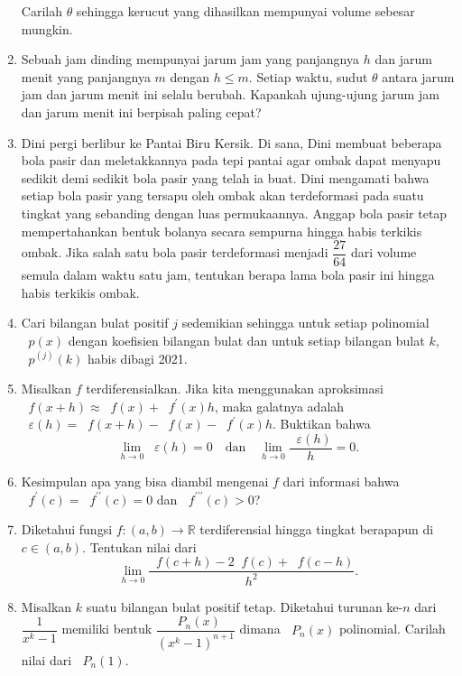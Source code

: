 \documentclass[12pt]{article}
\newcommand*\func[2]{\mathop{}\!{#1}{\left({#2}\right)}}
\begin{document}
\begin{enumerate}[leftmargin=*]
\begin{center}
		\end{center}
		Carilah $ \theta $ sehingga kerucut yang dihasilkan mempunyai volume sebesar mungkin.
		\item Sebuah jam dinding mempunyai jarum jam yang panjangnya $ h $ dan jarum menit yang panjangnya $ m $ dengan $ h \leq m $. Setiap waktu, sudut $ \theta $ antara jarum jam dan jarum menit ini selalu berubah. Kapankah ujung-ujung jarum jam dan jarum menit ini berpisah paling cepat?
		\item Dini pergi berlibur ke Pantai Biru Kersik. Di sana, Dini membuat beberapa bola pasir dan meletakkannya pada tepi pantai agar ombak dapat menyapu sedikit demi sedikit bola pasir yang telah ia buat. Dini mengamati bahwa setiap bola pasir yang tersapu oleh ombak akan terdeformasi pada suatu tingkat yang sebanding dengan luas permukaannya. Anggap bola pasir tetap mempertahankan bentuk bolanya secara sempurna hingga habis terkikis ombak. Jika salah satu bola pasir terdeformasi menjadi $ \dfrac{27}{64} $ dari volume semula dalam waktu satu jam, tentukan berapa lama bola pasir ini hingga habis terkikis ombak.
		\item Cari bilangan bulat positif $ j $ sedemikian sehingga untuk setiap polinomial $ \func{p}{x} $ dengan koefisien bilangan bulat dan untuk setiap bilangan bulat $ k $, $ \func{p^{\left(j\right)}}{k} $ habis dibagi 2021.
		\item Misalkan $ f $ terdiferensialkan. Jika kita menggunakan aproksimasi $ \func{f}{x + h} \approx \func{f}{x} + \func{f^{\prime}}{x}h $, maka galatnya adalah $ \func{\varepsilon}{h} = \func{f}{x + h} - \func{f}{x} - \func{f^{\prime}}{x}h $. Buktikan bahwa
		\[ \lim_{h \to 0}{\func{\varepsilon}{h}} = 0 \quad \mbox{dan} \quad \lim_{h \to 0}{\frac{\func{\varepsilon}{h}}{h}} = 0. \]
		\item Kesimpulan apa yang bisa diambil mengenai $ f $ dari informasi bahwa $ \func{f^{\prime}}{c} = \func{f^{\prime\prime}}{c} = 0 $ dan $ \func{f^{\prime\prime\prime}}{c} > 0 $?
		\item Diketahui fungsi $ f : \left(a, b\right) \to \mathbb{R} $ terdiferensial hingga tingkat berapapun di $ c \in \left(a, b\right) $. Tentukan nilai dari
		\[ \lim_{h \to 0}{\frac{\func{f}{c + h} - 2\func{f}{c} + \func{f}{c - h}}{h^{2}}}. \]
		\item Misalkan $ k $ suatu bilangan bulat positif tetap. Diketahui turunan ke-$ n $ dari $ \dfrac{1}{x^{k} - 1} $ memiliki bentuk $ \dfrac{\func{P_{n}}{x}}{\left(x^{k} - 1\right)^{n + 1}} $ dimana $ \func{P_{n}}{x} $ polinomial. Carilah nilai dari $ \func{P_{n}}{1} $.

\end{enumerate}
\end{document}
